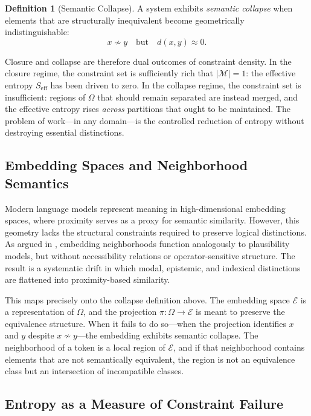 \documentclass[11pt, twoside]{article}
\theoremstyle{plain}
\theoremstyle{definition}
\newtheorem{definition}[theorem]{Definition}
\theoremstyle{remark}
\newcommand{\Seff}{S_{\text{eff}}}
\begin{document}
\begin{definition}[Semantic Collapse]
A system exhibits \emph{semantic collapse} when elements that are structurally inequivalent become geometrically indistinguishable:
\[
x \not\sim y \quad \text{but} \quad d(x,y) \approx 0.
\]
\end{definition}

Closure and collapse are therefore dual outcomes of constraint density. In the closure regime, the constraint set is sufficiently rich that $|\mathcal{M}| = 1$: the effective entropy $\Seff$ has been driven to zero. In the collapse regime, the constraint set is insufficient: regions of $\Omega$ that should remain separated are instead merged, and the effective entropy rises \emph{across} partitions that ought to be maintained. The problem of work---in any domain---is the controlled reduction of entropy without destroying essential distinctions.

\subsection{Embedding Spaces and Neighborhood Semantics}

Modern language models represent meaning in high-dimensional embedding spaces, where proximity serves as a proxy for semantic similarity. However, this geometry lacks the structural constraints required to preserve logical distinctions. As argued in \cite{denham2025collapse}, embedding neighborhoods function analogously to plausibility models, but without accessibility relations or operator-sensitive structure. The result is a systematic drift in which modal, epistemic, and indexical distinctions are flattened into proximity-based similarity.

This maps precisely onto the collapse definition above. The embedding space $\mathcal{E}$ is a representation of $\Omega$, and the projection $\pi : \Omega \to \mathcal{E}$ is meant to preserve the equivalence structure. When it fails to do so---when the projection identifies $x$ and $y$ despite $x \not\sim y$---the embedding exhibits semantic collapse. The neighborhood of a token is a local region of $\mathcal{E}$, and if that neighborhood contains elements that are not semantically equivalent, the region is not an equivalence class but an intersection of incompatible classes.

\subsection{Entropy as a Measure of Constraint Failure}
\end{document}
